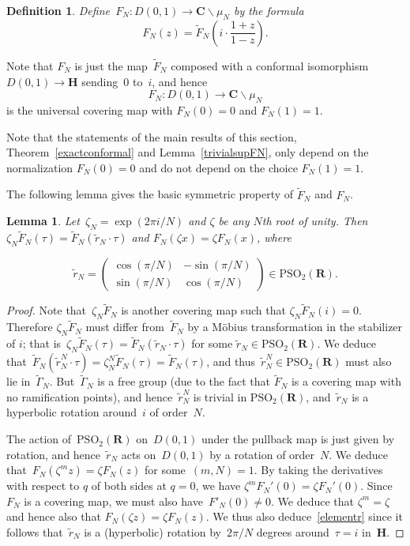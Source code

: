 \documentclass[10pt]{amsart}
\def\PSL{\mathrm{PSL}}
\renewcommand\setminus{\smallsetminus}
\def\wGamma{\widetilde{\Gamma}}
\def\wF{\widetilde{F}}
\def\PSO{\mathrm{PSO}}
\def\wr{\widetilde{r}}
\def\R{\mathbf{R}}
\newtheorem{lemma}[subsubsection]{Lemma}
\newtheorem{df}[subsubsection]{Definition}
\theoremstyle{remark}
\numberwithin{equation}{subsection}
\def\numequation{\addtocounter{subsubsection}{1}\begin{equation}}
\def\C{\mathbf{C}}
\def\H{\mathbf{H}}
\begin{document}

\begin{df} \label{tildeexample}
Define~$F_N: D(0,1) \rightarrow \C \setminus \mu_N$
by the formula
$$
F_N(z) = \wF_N \left( i \cdot \frac{1+z}{1-z} \right).
$$
\end{df}

Note that $F_N$ is just the map~$\wF_N$ composed with a conformal isomorphism~$D(0,1) \rightarrow \H$
 sending~$0$ to~$i$,
and hence
$$
F_N:D(0,1) \rightarrow \C \setminus \mu_N
$$
is the universal covering map with $F_N(0)=0$ and $F_N(1)=1$.

Note that the statements of the main results of this section, Theorem~\ref{exactconformal} and Lemma~\ref{trivialsupFN}, only depend on the normalization $F_N(0)=0$ and do not depend on the choice $F_N(1)=1$.

The following lemma gives the basic symmetric property of $\wF_N$ and $F_N$.
\begin{lemma}\label{FNbasic}
Let~$\zeta_N = \exp(2 \pi i/N)$ and $\zeta$ be any $N$th root of unity. Then $\zeta_N \wF_N(\tau) = \wF_N(\wr_N \cdot \tau)$ and $F_N(\zeta x) = \zeta F_N(x)$, where \numequation
\label{elementr}
\wr_N = \left( \begin{matrix}  \cos(\pi/N) & -\sin(\pi/N) \\ \sin(\pi/N) & \cos(\pi/N) \end{matrix} \right) \in \PSO_2(\R).
\end{equation}
\end{lemma}
\begin{proof}
Note that~$\zeta_N \wF_N$ is another covering map such that $\zeta_N \wF_N(i)=0$. Therefore $\zeta_N \wF_N$ must
differ from~$\wF_N$ by a M\"{o}bius transformation in the stabilizer of $i$; that is~$\zeta_N \wF_N(\tau) = \wF_N(\wr_N \cdot \tau)$ for some $\wr_N\in \PSO_2(\R)$. 
We deduce that~$\wF_N(\wr^N_N \cdot \tau) = \zeta_N^N \wF_N(\tau) = \wF_N(\tau)$,
 and thus~$\wr^N_N \in \PSO_2(\R)$ must also lie in~$\wGamma_N$. But~$\wGamma_N$ is a free group (due to the fact that $\wF_N$ is a covering map with no ramification points),
 and hence~$\wr^N_N$ is trivial in $\PSO_2(\R)$, and~$\wr_N$ is a hyperbolic rotation around~$i$ of order~$N$.
 
The action of~$\PSO_2(\R)$ on~$D(0,1)$ under the pullback map is just given by rotation, and hence~$\wr_N$
acts on~$D(0,1)$ by a rotation of order~$N$. We deduce that~$F_N(\zeta^m z) = \zeta F_N(z)$ for some~$(m,N) = 1$. By taking
the derivatives with respect to $q$ of both sides at $q=0$, we have $\zeta^m F_N'(0)=\zeta F_N'(0)$.
Since~$F_N$
is a covering  map, we must also have~$F'_N(0) \ne 0$. We deduce that $\zeta^m = \zeta$ and hence also that $F_N(\zeta z) = \zeta F_N(z)$. We thus also deduce~\eqref{elementr} since it follows
that~$\wr_N$ is a (hyperbolic) rotation  by~$2\pi/N$ degrees around~$\tau = i$ in~$\H$.
\end{proof}
\end{document}
